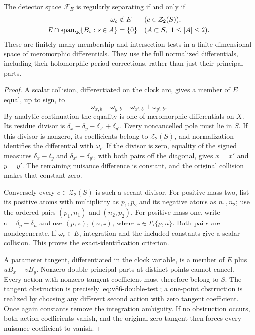 \begin{theorem}\label{thm:v86-divisor}
The detector space $\mathcal F_E$ is regularly separating if and only if
\begin{align}
 \omega_c&\notin E &&(c\in\mathcal Z_2(S)),
                                      \label{eq:v86-charge-test}\\
 E\cap\operatorname{span}_{\R}\{B_s:s\in A\}&=\{0\}
             &&(A\subset S,\ 1\le |A|\le2).
                                      \label{eq:v86-double-test}
\end{align}
These are finitely many membership and intersection tests in a
finite-dimensional space of meromorphic differentials. They use the
full normalized differentials, including their holomorphic period
corrections, rather than just their principal parts.
\end{theorem}
\begin{proof}
A scalar collision, differentiated on the clock arc, gives a member of
$E$ equal, up to sign, to
\[
       \omega_{x,b}-\omega_{y,b}-\omega_{x',b}+\omega_{y',b}.
\]
By analytic continuation the equality is one of meromorphic
differentials on $X$. Its residue divisor is
$\delta_x-\delta_y-\delta_{x'}+\delta_{y'}$.
Every noncancelled pole must lie in $S$. If this divisor is nonzero,
its coefficients belong to $\mathcal Z_2(S)$, and normalization
identifies the differential with $\omega_c$. If the divisor is zero,
equality of the signed measures $\delta_x-\delta_y$ and
$\delta_{x'}-\delta_{y'}$, with both pairs off the diagonal, gives
$x=x'$ and $y=y'$. The remaining nuisance difference is constant,
and the original collision makes that constant zero.

Conversely every $c\in\mathcal Z_2(S)$ is such a secant divisor.
For positive mass two, list its positive atoms with multiplicity as
$p_1,p_2$ and its negative atoms as $n_1,n_2$; use the ordered pairs
$(p_1,n_1)$ and $(n_2,p_2)$. For positive mass one, write
$c=\delta_p-\delta_n$ and use $(p,z),(n,z)$, where
$z\in I\setminus\{p,n\}$. Both pairs are nondegenerate.
If $\omega_c\in E$, integration and the included constants give a
scalar collision. This proves the exact-identification criterion.

A parameter tangent, differentiated in the clock variable, is a member
of $E$ plus $uB_x-vB_y$. Nonzero double principal parts at distinct
points cannot cancel. Every action with nonzero tangent coefficient
must therefore belong to $S$. The tangent obstruction is precisely
\eqref{eq:v86-double-test}; a one-point obstruction is realized by
choosing any different second action with zero tangent coefficient.
Once again constants remove the integration ambiguity. If no
obstruction occurs, both action coefficients vanish, and the original
zero tangent then forces every nuisance coefficient to vanish.
\end{proof}
